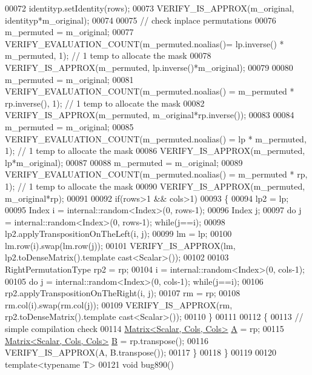 \begin{DoxyCode}
00072   identityp.setIdentity(rows);
00073   VERIFY\_IS\_APPROX(m\_original, identityp*m\_original);
00074   
00075   \textcolor{comment}{// check inplace permutations}
00076   m\_permuted = m\_original;
00077   VERIFY\_EVALUATION\_COUNT(m\_permuted.noalias()= lp.inverse() * m\_permuted, 1); \textcolor{comment}{// 1 temp to allocate the
       mask}
00078   VERIFY\_IS\_APPROX(m\_permuted, lp.inverse()*m\_original);
00079   
00080   m\_permuted = m\_original;
00081   VERIFY\_EVALUATION\_COUNT(m\_permuted.noalias() = m\_permuted * rp.inverse(), 1); \textcolor{comment}{// 1 temp to allocate the
       mask}
00082   VERIFY\_IS\_APPROX(m\_permuted, m\_original*rp.inverse());
00083   
00084   m\_permuted = m\_original;
00085   VERIFY\_EVALUATION\_COUNT(m\_permuted.noalias() = lp * m\_permuted, 1); \textcolor{comment}{// 1 temp to allocate the mask}
00086   VERIFY\_IS\_APPROX(m\_permuted, lp*m\_original);
00087   
00088   m\_permuted = m\_original;
00089   VERIFY\_EVALUATION\_COUNT(m\_permuted.noalias() = m\_permuted * rp, 1); \textcolor{comment}{// 1 temp to allocate the mask}
00090   VERIFY\_IS\_APPROX(m\_permuted, m\_original*rp);
00091 
00092   \textcolor{keywordflow}{if}(rows>1 && cols>1)
00093   \{
00094     lp2 = lp;
00095     Index i = internal::random<Index>(0, rows-1);
00096     Index j;
00097     \textcolor{keywordflow}{do} j = internal::random<Index>(0, rows-1); \textcolor{keywordflow}{while}(j==i);
00098     lp2.applyTranspositionOnTheLeft(i, j);
00099     lm = lp;
00100     lm.row(i).swap(lm.row(j));
00101     VERIFY\_IS\_APPROX(lm, lp2.toDenseMatrix().template cast<Scalar>());
00102 
00103     RightPermutationType rp2 = rp;
00104     i = internal::random<Index>(0, cols-1);
00105     \textcolor{keywordflow}{do} j = internal::random<Index>(0, cols-1); \textcolor{keywordflow}{while}(j==i);
00106     rp2.applyTranspositionOnTheRight(i, j);
00107     rm = rp;
00108     rm.col(i).swap(rm.col(j));
00109     VERIFY\_IS\_APPROX(rm, rp2.toDenseMatrix().template cast<Scalar>());
00110   \}
00111 
00112   \{
00113     \textcolor{comment}{// simple compilation check}
00114     \hyperlink{group___core___module_class_eigen_1_1_matrix}{Matrix<Scalar, Cols, Cols>} \hyperlink{group___core___module_class_eigen_1_1_matrix}{A} = rp;
00115     \hyperlink{group___core___module_class_eigen_1_1_matrix}{Matrix<Scalar, Cols, Cols>} \hyperlink{group___core___module_class_eigen_1_1_matrix}{B} = rp.transpose();
00116     VERIFY\_IS\_APPROX(A, B.transpose());
00117   \}
00118 \}
00119 
00120 \textcolor{keyword}{template}<\textcolor{keyword}{typename} T>
00121 \textcolor{keywordtype}{void} bug890()

\end{DoxyCode}
